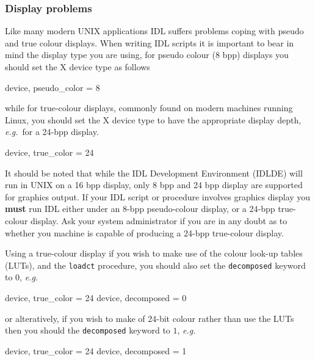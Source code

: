 \documentclass[twoside,11pt]{starlink}
\begin{document}
\subsubsection{Display problems}

Like many modern UNIX applications IDL suffers problems coping with
pseudo and true colour displays.  When writing IDL scripts it is
important to bear in mind the display type you are using, for pseudo
colour (8 bpp) displays you should set the X device type as follows

\begin{small}
\begin{terminalv}
device, pseudo_color = 8
\end{terminalv}
\end{small}

while for true-colour displays, commonly found on modern machines
running Linux, you should set the X device type to have the
appropriate display depth, \emph{e.g.}\ for a 24-bpp display.

\begin{small}
\begin{terminalv}
device, true_color = 24
\end{terminalv}
\end{small}

It should be noted that while the IDL Development Environment (IDLDE)
will run in UNIX on a 16 bpp display, only 8 bpp and 24 bpp display
are supported for graphics output.  If your IDL script or procedure
involves graphics display you \textbf{must} run IDL either under an 8-bpp
pseudo-colour display, or a 24-bpp true-colour display.  Ask your
system administrator if you are in any doubt as to whether you machine
is capable of producing a 24-bpp true-colour display.

Using a true-colour display if you wish to make use of the colour
look-up tables (LUTs), and the \texttt{loadct} procedure, you should also
set the \texttt{decomposed} keyword to $0$, \emph{e.g.}\

\begin{small}
\begin{terminalv}
device, true_color = 24
device, decomposed = 0
\end{terminalv}
\end{small}

or alteratively, if you wish to make of 24-bit colour rather than use
the LUTs then you should the \texttt{decomposed} keyword to $1$,
\emph{e.g.}\

\begin{small}
\begin{terminalv}
device, true_color = 24
device, decomposed = 1
\end{terminalv}
\end{small}
\end{document}
